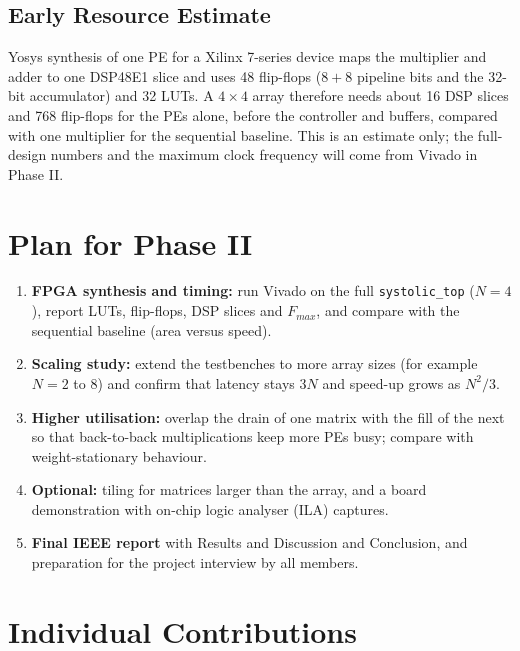 \documentclass[conference,a4paper]{IEEEtran}
\begin{document}
\subsection{Early Resource Estimate}
Yosys synthesis of one PE for a Xilinx 7-series device maps the multiplier and adder to one DSP48E1 slice and uses 48 flip-flops ($8 + 8$ pipeline bits and the 32-bit accumulator) and 32 LUTs. A $4\times4$ array therefore needs about 16 DSP slices and 768 flip-flops for the PEs alone, before the controller and buffers, compared with one multiplier for the sequential baseline. This is an estimate only; the full-design numbers and the maximum clock frequency will come from Vivado in Phase II.

\section{Plan for Phase II}
\begin{enumerate}
\item \textbf{FPGA synthesis and timing:} run Vivado on the full \texttt{systolic\_top} ($N = 4$), report LUTs, flip-flops, DSP slices and $F_{max}$, and compare with the sequential baseline (area versus speed).
\item \textbf{Scaling study:} extend the testbenches to more array sizes (for example $N = 2$ to 8) and confirm that latency stays $3N$ and speed-up grows as $N^2/3$.
\item \textbf{Higher utilisation:} overlap the drain of one matrix with the fill of the next so that back-to-back multiplications keep more PEs busy; compare with weight-stationary behaviour.
\item \textbf{Optional:} tiling for matrices larger than the array, and a board demonstration with on-chip logic analyser (ILA) captures.
\item \textbf{Final IEEE report} with Results and Discussion and Conclusion, and preparation for the project interview by all members.
\end{enumerate}

\section{Individual Contributions}
\end{document}
